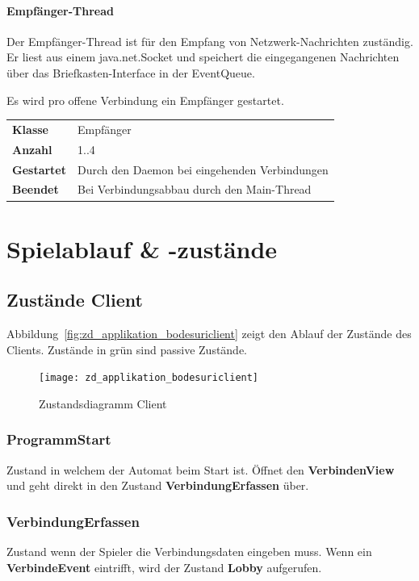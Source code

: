 \documentclass[12pt,halfparskip]{scrartcl}
\begin{document}
\paragraph{Empfänger-Thread}

Der Empfänger-Thread ist für den Empfang von Netzwerk-Nachrichten zuständig. Er liest aus einem java.net.Socket und speichert die eingegangenen Nachrichten über das Briefkasten-Interface in der EventQueue.

Es wird pro offene Verbindung ein Empfänger gestartet.

\begin{tabular}{@{} l p{12.5cm}}
\textbf{Klasse}       & Empfänger \\
\textbf{Anzahl}       & 1..4 \\
\textbf{Gestartet}    & Durch den Daemon bei eingehenden Verbindungen  \\
\textbf{Beendet}      & Bei Verbindungsabbau durch den Main-Thread
\end{tabular}

\clearpage
\section{Spielablauf \& -zustände}
\label{spielzustaende_nachrichten}
\subsection{Zustände Client}
\label{sub:zustände_client}
Abbildung~\vref{fig:zd_applikation_bodesuriclient} zeigt den Ablauf der Zustände des Clients. Zustände in grün sind passive Zustände.
\begin{figure}[h]
	\centering
	\texttt{[image: zd\_applikation\_bodesuriclient]}
	\caption{Zustandsdiagramm Client}
	\label{fig:zd_applikation_bodesuriclient}
\end{figure}

\subsubsection{ProgrammStart}
\label{ssub:programmstart}
Zustand in welchem der Automat beim Start ist. Öffnet den \textbf{VerbindenView} und geht direkt in den Zustand \textbf{VerbindungErfassen} über.


\subsubsection{VerbindungErfassen}
\label{ssub:verbinungerfassen}
Zustand wenn der Spieler die Verbindungsdaten eingeben muss. Wenn ein \textbf{VerbindeEvent} eintrifft, wird der Zustand \textbf{Lobby} aufgerufen.
\end{document}
